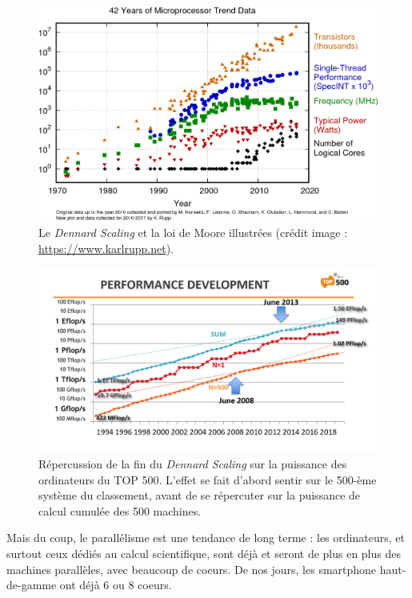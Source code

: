 \begin{figure}
  \includegraphics[width=\textwidth]{42-years-processor-trend.png}
  \caption{Le \og \emph{Dennard Scaling} et la loi de Moore illustrées (crédit image : \url{https://www.karlrupp.net})\label{fig:dennard_scaling}.}
\end{figure}

\begin{figure}
  \includegraphics[width=\textwidth]{Top500-Dennard-scaling-effect.png}
  \caption{Répercussion de la fin du \og \emph{Dennard Scaling} sur la puissance
    des ordinateurs du TOP 500. L'effet se fait d'abord sentir sur le 500-ème
    système du classement, avant de se répercuter sur la puissance de calcul
    cumulée des 500 machines.\label{fig:dennard_scaling2}}
\end{figure}

Mais du coup, le parallélisme est une tendance de long terme : les ordinateurs,
et surtout ceux dédiés au calcul scientifique, sont déjà et seront de plus en
plus des machines parallèles, avec beaucoup de coeurs. De nos jours, les
smartphone haut-de-gamme ont déjà 6 ou 8 coeurs.

